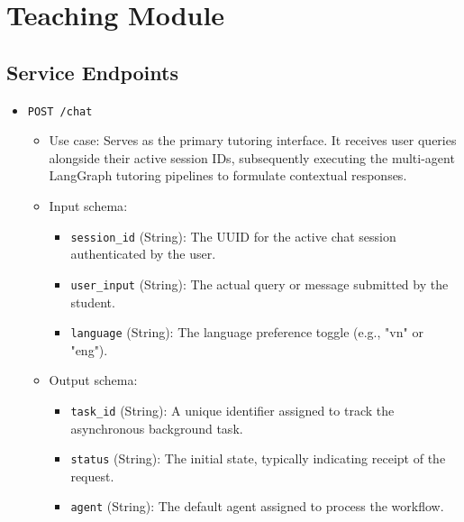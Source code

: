 \section{Teaching Module}
\subsection{Service Endpoints}
\begin{itemize}
    \item {\texttt{POST /chat}}
    \begin{itemize}
        \item {Use case}: Serves as the primary tutoring interface. It receives user queries alongside their active session IDs, subsequently executing the multi-agent LangGraph tutoring pipelines to formulate contextual responses.
        \item {Input schema}:
        \begin{itemize}
            \item \texttt{session\_id} (String): The UUID for the active chat session authenticated by the user.
            \item \texttt{user\_input} (String): The actual query or message submitted by the student.
            \item \texttt{language} (String): The language preference toggle (e.g., "vn" or "eng").
        \end{itemize}
        \item {Output schema}:
        \begin{itemize}
            \item \texttt{task\_id} (String): A unique identifier assigned to track the asynchronous background task.
            \item \texttt{status} (String): The initial state, typically indicating receipt of the request.
            \item \texttt{agent} (String): The default agent assigned to process the workflow.
        \end{itemize}
    \end{itemize}


\end{itemize}
